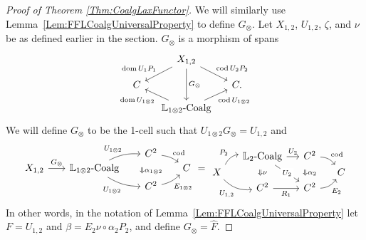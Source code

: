\begin{proof}[Proof of Theorem \ref{Thm:CoalgLaxFunctor}]
	We will similarly use Lemma~\ref{Lem:FFLCoalgUniversalProperty} to define $G_{\otimes}$. Let $X_{1,2}$, $U_{1,2}$, $\zeta$, and $\nu$ be as defined earlier in the section. $G_{\otimes}$ is a morphism of spans
	\[
	\begin{tikzcd}[row sep=small,column sep=small]
		{} & X_{1,2} \dlar[swap]{\dom U_1P_1} \drar{\cod U_2P_2} \ar{dd}{G_{\otimes}} & \\
		C && C. \\
		& \LCoalg[1\otimes2] \ular{\dom U_{1\otimes 2}} \urar[swap]{\cod U_{1\otimes 2}}
	\end{tikzcd}
	\]
	We will define $G_{\otimes}$ to be the 1-cell such that $U_{1\otimes 2}G_{\otimes}=U_{1,2}$ and
	\[
	\begin{tikzcd}[row sep=0ex, column sep=4ex, bend angle=15, baseline=(B.base)]
		{} && |[alias=domA]| C^2 \drar[bend left][]{\cod} & \\
		|[alias=B]| X_{1,2} \rar{G_{\otimes}} 
			& \LCoalg[1\otimes2] \urar[bend left][]{U_{1\otimes2}} \drar[bend right][swap]{U_{1\otimes2}} 
			&& C \\
		&& |[alias=codA]| C^2 \urar[bend right][swap]{E_{1\otimes2}}
		\twocellA{\alpha_{1\otimes2}}
	\end{tikzcd}
	=
	\begin{tikzcd}[bend angle=25, row sep=0ex, column sep=3ex]
		& |[alias=domA]| \LCoalg[2] \rar{U_2} \ar{ddr}[description]{U_2}
			& |[alias=domB]| C^2 \drar[bend left][]{\cod} & \\
		X \urar[bend left][]{P_2} \drar[bend right][swap]{U_{1,2}}
			&&& C \\
		& |[alias=codA]| C^2 \rar[swap]{R_1}
			& |[alias=codB]| C^2 \urar[bend right][swap]{E_2} &
		\twocellA{\nu}
		\twocellB{\alpha_2}
	\end{tikzcd}
	\]
	In other words, in the notation of Lemma~\ref{Lem:FFLCoalgUniversalProperty} let $F=U_{1,2}$ and $\beta=E_2\nu\circ\alpha_2P_2$, and define $G_{\otimes}=\hat{F}$.


\end{proof}
